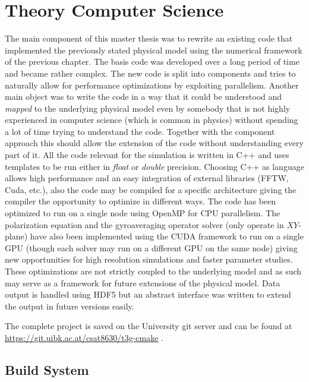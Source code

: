 \documentclass[12pt,oneside,bibtotoc,liststotoc]{scrbook}
\begin{document}
\chapter{Theory Computer Science}
The main component of this master thesis was to rewrite an existing code that implemented the previously stated physical model using the numerical framework of the previous chapter. The basis code was developed over a long period of time and became rather complex. The new code is split into components and tries to naturally allow for performance optimizations by exploiting parallelism. Another main object was to write the code in a way that it could be understood and \textit{mapped} to the underlying physical model even by somebody that is not highly experienced in computer science (which is common in physics) without spending a lot of time trying to understand the code. Together with the component approach this should allow the extension of the code without understanding every part of it.\newline
All the code relevant for the simulation is written in C++ and uses templates to be run either in \textit{float} or \textit{double} precision. Choosing C++ as language allows high performance and an easy integration of external libraries (FFTW, Cuda, etc.), also the code may be compiled for a specific architecture giving the compiler the opportunity to optimize in different ways.\newline
The code has been optimized to run on a single node using OpenMP for CPU parallelism. The polarization equation and the gyroaveraging operator solver (only operate in $XY$-plane) have also been implemented using the CUDA framework to run on a single GPU (though each solver may run on a different GPU on the same node) giving new opportunities for high resolution simulations and faster parameter studies. These optimizations are not strictly coupled to the underlying model and as such may serve as a framework for future extensions of the physical model.\newline
Data output is handled using HDF5 but an abstract interface was written to extend the output in future versions easily.

The complete project is saved on the University git server and can be found at \href{https://git.uibk.ac.at/csat8630/t3g-cmake}{https://git.uibk.ac.at/csat8630/t3g-cmake}
.

\section{Build System}

\end{document}
